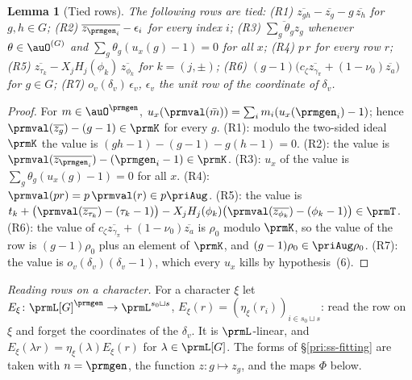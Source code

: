 \documentclass[10pt]{amsart}
\newtheorem{lemma}[theorem]{Lemma}
\theoremstyle{definition}
\theoremstyle{remark}
\begin{document}
\begin{lemma}[Tied rows]\label{prm:tied}
The following rows are tied:
{\rm(R1)} $\overline{z_{gh}}-\overline{z_g}-g\,\overline{z_h}$ for $g,h\in G$;
{\rm(R2)} $\overline{z_{\prmgen_i}}-\epsilon_i$ for every index $i$;
{\rm(R3)} $\overline{\sum_g\theta_gz_g}$ whenever $\theta\in\auO^{(G)}$ and $\sum_g\theta_g(u_x(g)-1)=0$
for all $x$;
{\rm(R4)} $p\,r$ for every row $r$;
{\rm(R5)} $\overline{z_{\tau_k}}-X_jH_j(\phi_k)\,\overline{z_{\phi_k}}$ for $k=(j,\pm)$;
{\rm(R6)} $(g-1)\bigl(c_\zeta\overline{z_{\gamma_\pi}}+(1-\nu_0)\overline{z_a}\bigr)$ for $g\in G$;
{\rm(R7)} $o_v(\delta_v)\,\epsilon_{v}$, $\epsilon_v$ the unit row of the coordinate of $\delta_v$.
\end{lemma}
\begin{proof}
For $m\in\auO^{\prmgen}$, $u_x(\prmval(\bar m))=\sum_im_i(u_x(\prmgen_i)-1)$; hence
$\prmval(\overline{z_g})-(g-1)\in\prmK$ for every $g$. (R1): modulo the two-sided ideal $\prmK$ the value
is $(gh-1)-(g-1)-g(h-1)=0$. (R2): the value is $\prmval(\overline{z_{\prmgen_i}})-(\prmgen_i-1)\in
\prmK$. (R3): $u_x$ of the value is $\sum_g\theta_g(u_x(g)-1)=0$ for all $x$. (R4): $\prmval(pr)=p\,
\prmval(r)\in p\priAug$. (R5): the value is $t_k+\bigl(\prmval(\overline{z_{\tau_k}})-(\tau_k-1)\bigr)-
X_jH_j(\phi_k)\bigl(\prmval(\overline{z_{\phi_k}})-(\phi_k-1)\bigr)\in\prmT$. (R6): the value of
$c_\zeta\overline{z_{\gamma_\pi}}+(1-\nu_0)\overline{z_a}$ is $\rho_0$ modulo $\prmK$, so the value of the row
is $(g-1)\rho_0$ plus an element of $\prmK$, and $(g-1)\rho_0\in\priAug\rho_0$. (R7): the value is
$o_v(\delta_v)(\delta_v-1)$, which every $u_x$ kills by hypothesis~(6).
\end{proof}

\emph{Reading rows on a character.} For a character $\xi$ let $E_\xi\colon\prmL[G]^{\prmgen}\to
\prmL^{s_0\sqcup s}$, $E_\xi(r)=(\eta_\xi(r_i))_{i\in s_0\sqcup s}$: read the row on $\xi$ and forget
the coordinates of the $\delta_v$. It is $\prmL$-linear, and $E_\xi(\lambda r)=\eta_\xi(\lambda)E_\xi(r)$
for $\lambda\in\prmL[G]$. The forms of \S\ref{pri:ss-fitting} are taken with $n=\prmgen$, the
function $z\colon g\mapsto z_g$, and the maps $\Phi$ below.
\end{document}
